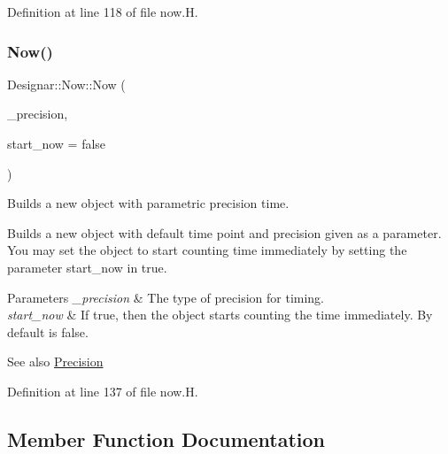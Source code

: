 Definition at line 118 of file now.\+H.

\mbox{\label{class_designar_1_1_now_ac98ba684b09b3ed28d8a615d59c01aa2}} 
\subsubsection{\texorpdfstring{Now()}{Now()}\hspace{0.1cm}{\footnotesize\ttfamily [2/2]}}
{\footnotesize\ttfamily Designar\+::\+Now\+::\+Now (\begin{DoxyParamCaption}\item[{const \hyperlink{class_designar_1_1_now_a3c9f5e57907c88cbe63c70a64638c072}{Precision} \&}]{\+\_\+precision,  }\item[{bool}]{start\+\_\+now = {\ttfamily false} }\end{DoxyParamCaption})\hspace{0.3cm}{\ttfamily [inline]}}



Builds a new object with parametric precision time. 

Builds a new object with default time point and precision given as a parameter. You may set the object to start counting time immediately by setting the parameter start\+\_\+now in true.


\begin{DoxyParams}{Parameters}
{\em \+\_\+precision} & The type of precision for timing. \\
\hline
{\em start\+\_\+now} & If true, then the object starts counting the time immediately. By default is false.\\
\hline
\end{DoxyParams}
\begin{DoxySeeAlso}{See also}
\hyperlink{class_designar_1_1_now_a3c9f5e57907c88cbe63c70a64638c072}{Precision} 
\end{DoxySeeAlso}


Definition at line 137 of file now.\+H.



\subsection{Member Function Documentation}
\mbox{\label{class_designar_1_1_now_aa140dcc748ca53e2c42548d50273bfaa}} 
